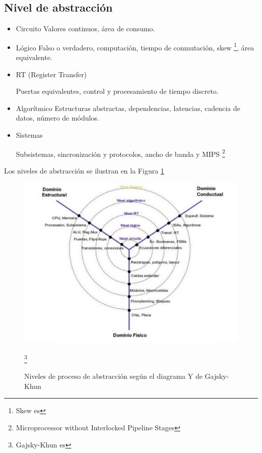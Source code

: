 \documentclass[12pt,letterpaper]{book}
\begin{document}
\subsection{Nivel de abstracción}

\begin{itemize}
\item Circuito
Valores continuos, área de consumo.

\item Lógico
Falso o verdadero, computación, tiempo de conmutación, skew \footnote{Skew es }, área equivalente.

\item RT (Register Transfer)

Puertas equivalentes, control y procesamiento de tiempo discreto.

\item Algorítmico
Estructuras abstractas, dependencias, latencias, cadencia de datos, número de módulos.

\item Sistemas

Subsistemas, sincronización y protocolos, ancho de banda y MIPS \footnote{Microprocessor without Interlocked Pipeline Stages} 

\end{itemize}

Los niveles de abstracción se ilustran en la Figura \ref{diagramaY2}

\begin{figure}[H]
\centering
\includegraphics[width=1\textwidth]{figures/diagramaY2.png}
\caption{Niveles de proceso de abstracción según el  diagrama Y de Gajsky-Khun}\footnote{Gajsky-Khun es }
\label{diagramaY2}
\end{figure}
\end{document}
